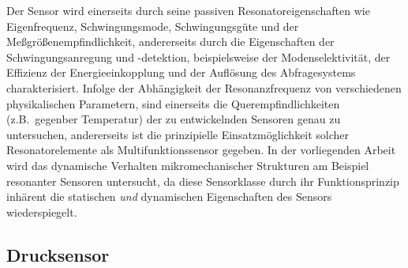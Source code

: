 Der Sensor wird einerseits
durch seine passiven Resonatoreigenschaften wie Eigenfrequenz,
Schwingungsmode, Schwingungsgüte und der Meßgrößenempfindlichkeit,
andererseits durch die Eigenschaften der Schwingungsanregung und
-detektion, beispielsweise der Modenselektivität, der Effizienz der
Energieeinkopplung und der Auflösung des Abfragesystems charakterisiert.
Infolge der Abhängigkeit der Resonanzfrequenz von verschiedenen
physikalischen Parametern, sind einerseits die Querempfindlichkeiten
(z.B.\ gegenber Temperatur) der zu entwickelnden Sensoren genau zu
untersuchen, andererseits ist die prinzipielle Einsatzmöglichkeit solcher
Resonatorelemente als Multifunktionssensor gegeben. In der vorliegenden
Arbeit wird das dynamische
Verhalten mikromechanischer Strukturen am Beispiel resonanter Sensoren
untersucht, da diese Sensorklasse durch ihr Funktionsprinzip inhärent die
statischen {\em und} dynamischen Eigenschaften des Sensors wiederspiegelt.


\subsection{Drucksensor}
\label{drucksensor}

